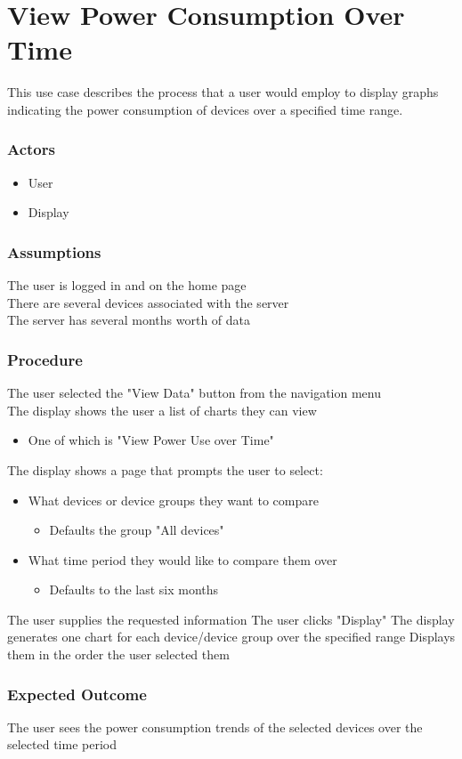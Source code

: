 \section{View Power Consumption Over Time}
This use case describes the process that a user would employ to display graphs indicating the power consumption of devices over a specified time range.

\subsubsection{Actors}
\begin{itemize}
	\item User
	\item Display
\end{itemize}

\subsubsection{Assumptions}

The user is logged in and on the home page\\
There are several devices associated with the server\\
The server has several months worth of data 

\subsubsection{Procedure}

The user selected the "View Data" button from the navigation menu\\
The display shows the user a list of charts they can view
\begin{itemize}
	\item One of which is "View Power Use over Time" 
\end{itemize}
The display shows a page that prompts the user to select:
\begin{itemize}
	\item What devices or device groups they want to compare
	\begin{itemize}
		\item Defaults the group "All devices" 
	\end{itemize}
	\item What time period they would like to compare them over
	\begin{itemize}
		\item Defaults to the last six months 
	\end{itemize}
\end{itemize}
The user supplies the requested information
The user clicks "Display"
The display generates one chart for each device/device group over the specified range
Displays them in the order the user selected them 

\subsubsection{Expected Outcome}

The user sees the power consumption trends of the selected devices over the selected time period 